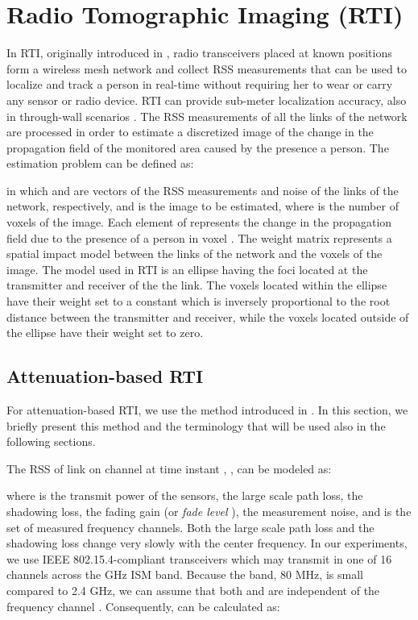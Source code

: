 \documentclass[conference]{IEEEtran}
\begin{document}
\section{Radio Tomographic Imaging (RTI)} \label{sec:rti}

In RTI, originally introduced in \cite{Wilson_RTI_2010}, radio
transceivers placed at known positions form a wireless mesh network
and collect RSS measurements that can be used to localize and track a
person in real-time without requiring her to wear or carry any sensor
or radio device. RTI can provide sub-meter localization accuracy, also
in through-wall scenarios
\cite{Wilson_VRTI_2011,MASS,Grandma_2012}. The RSS measurements of all
the links of the network are processed in order to estimate a
discretized image  of the change in the propagation field
of the monitored area caused by the presence a person. The estimation
problem can be defined as:

in which  and  are  vectors of the
RSS measurements and noise of the  links of the network,
respectively, and  is the  image to be
estimated, where  is the number of voxels of the image. Each
element  of  represents the change in the propagation
field due to the presence of a person in voxel . The 
weight matrix  represents a spatial impact model between
the  links of the network and the  voxels of the image. The
model used in RTI
\cite{Wilson_VRTI_2011,Wilson_RTI_2010,Patwari_corr_shadow_2008,MASS}
is an ellipse having the foci located at the transmitter and receiver
of the the link. The voxels located within the ellipse have their
weight set to a constant which is inversely proportional to the root
distance between the transmitter and receiver, while the voxels
located outside of the ellipse have their weight set to zero.



\subsection{Attenuation-based RTI} \label{sec:attenuation_based_RTI}

For attenuation-based RTI, we use the method introduced in
\cite{MASS}. In this section, we briefly present this method and the
terminology that will be used also in the following sections.

The RSS of link  on channel  at time instant , ,
can be modeled as:

where  is the transmit power of the sensors,  the
large scale path loss,  the shadowing loss,  the
fading gain (or \emph{fade level} \cite{Wilson_SkewL_2011}),
 the measurement noise, and  is the set of measured frequency channels. Both the large scale
path loss  and the shadowing loss  change very
slowly with the center frequency. In our experiments, we use IEEE
802.15.4-compliant transceivers \cite{tidongle} which may transmit in
one of 16 channels across the  GHz ISM band.  Because the band,
80 MHz, is small compared to 2.4 GHz, we can assume that both
 and  are independent of the frequency channel
. Consequently,  can be calculated as:
\end{document}
